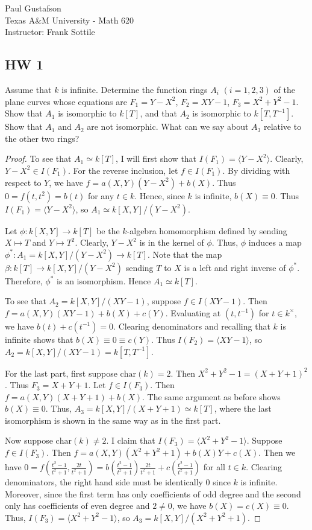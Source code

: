 \documentclass{article}
\begin{document}
\noindent Paul Gustafson\\
\noindent Texas A\&M University - Math 620\\ 
\noindent Instructor: Frank Sottile

\subsection*{HW 1}
 Assume that $k$ is infinite. Determine the function rings $A_i$ $(i = 1,2,3)$ of the plane curves whose equations are $F_1 = Y - X^2$, $F_2 = XY -1 $, $F_3 = X^2 + Y^2 - 1$. Show that $A_1$ is isomorphic to $k[T]$, and that $A_2$ is isomorphic to $k[T, T^{-1}]$. Show that $A_1$ and $A_2$ are not isomorphic. What can we say about $A_3$ relative to the other two rings?
\begin{proof}
To see that $A_1 \simeq k[T]$, I will first show that $I(F_1) = \langle Y - X^2 \rangle$. Clearly, $Y - X^2 \in I(F_1)$. For the reverse inclusion, let $f \in I(F_1)$. By dividing with respect to $Y$, we have $f = a(X,Y)(Y - X^2) + b(X)$.  Thus $0 = f(t,t^2) = b(t)$ for any $t \in k$.  Hence, since $k$ is infinite, $b(X) \equiv 0$.  Thus $I(F_1) = \langle Y - X^2 \rangle$, so $A_1 \simeq k[X,Y]/(Y - X^2)$.

Let $\phi: k[X,Y] \to k[T]$ be the $k$-algebra homomorphism defined by sending $X \mapsto T$ and $Y \mapsto T^2$.  Clearly, $Y - X^2$ is in the kernel of $\phi$.  Thus, $\phi$ induces a map $\phi^*: A_1 = k[X,Y]/(Y - X^2) \to k[T]$.  Note that the map $\beta: k[T] \to k[X,Y]/(Y - X^2)$ sending $T$ to $X$ is a left and right inverse of $\phi^*$.  Therefore, $\phi^*$ is an isomorphism. Hence $A_1 \simeq k[T]$.

To see that $A_2 = k[X,Y]/(XY - 1)$, suppose $f \in I(XY - 1)$.  Then $f = a(X,Y) (XY - 1) + b(X) + c(Y)$.  Evaluating at $(t, t^{-1})$ for $t \in k^\times$, we have $b(t) + c(t^{-1}) = 0$.  Clearing denominators and recalling that $k$ is infinite shows that $b(X) \equiv 0 \equiv c(Y)$.  Thus $I(F_2) = \langle XY - 1 \rangle$, so $A_2 = k[X,Y]/(XY - 1) = k[T, T^{-1}]$. 

For the last part, first suppose $\mathrm{char}(k) = 2$.  Then $X^2 + Y^2 -1 = (X + Y + 1)^2$. Thus $F_3 = X + Y + 1$.  Let $f \in I(F_3)$.  Then $f = a(X,Y)(X + Y + 1) + b(X)$.  The same argument as before shows $b(X) \equiv 0$.  Thus, $A_3 = k[X,Y]/(X + Y + 1) \simeq k[T]$, where the last isomorphism is shown in the same way as in the first part.

Now suppose $\mathrm{char}(k) \neq 2$. I claim that $I(F_3) = \langle X^2 + Y^2 - 1 \rangle$.  Suppose $f \in I(F_3)$.  Then $f = a(X,Y)(X^2 + Y^2 + 1) + b(X) Y + c(X)$.  Then we have $0 = f(\frac{t^2 - 1}{t^2 + 1}, \frac{2t}{t^2 + 1}) = b(\frac{t^2 - 1}{t^2 + 1}) \frac{2t}{t^2+1} + c(\frac{t^2 - 1}{t^2 + 1})$ for all $t \in k$. Clearing denominators, the right hand side must be identically 0 since $k$ is infinite.  Moreover, since the first term has only coefficients of odd degree and the second only has coefficients of even degree and $2 \neq 0$, we have $b(X) = c(X) \equiv 0$. Thus, $I(F_3) = \langle X^2 + Y^2 - 1 \rangle$, so $A_3 = k[X,Y]/(X^2 + Y^2 + 1)$.


\end{proof}
\end{document}

